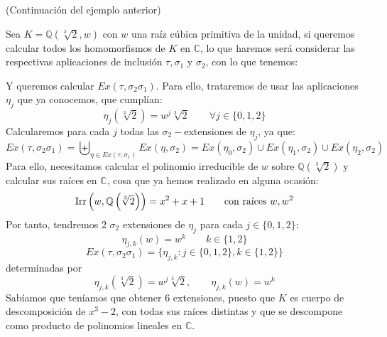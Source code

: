 \begin{ejemplo}
    (Continuación del ejemplo anterior)

    \noindent
    Sea $K = \mathbb{Q}\left(\sqrt[3]{2},w\right)$ con $w$ una raíz cúbica primitiva de la unidad, si queremos calcular todos los homomorfismos de $K$ en $\mathbb{C}$, lo que haremos será considerar las respectivas aplicaciones de inclusión $\tau,\sigma_1$ y $\sigma_2$, con lo que tenemos:
    \begin{figure}[H]
        \centering
    \end{figure}
    \noindent
    Y queremos calcular $Ex(\tau,\sigma_2\sigma_1)$. Para ello, trataremos de usar las aplicaciones $\eta_j$ que ya conocemos, que cumplían:
    \begin{equation*}
        \eta_j\left(\sqrt[3]{2}\right) = w^j \sqrt[3]{2} \qquad \forall j \in \{0,1,2\}
    \end{equation*}
    Calcularemos para cada $j$ todas las $\sigma_2-$extensiones de $\eta_j$, ya que:
    \begin{equation*}
        Ex(\tau,\sigma_2\sigma_1) = \biguplus_{\eta \in  Ex(\tau,\sigma_1)}Ex(\eta, \sigma_2) = Ex(\eta_0,\sigma_2) \cup Ex(\eta_1, \sigma_2) \cup Ex(\eta_2,\sigma_2)
    \end{equation*}
    Para ello, necesitamos calcular el polinomio irreducible de $w$ sobre $\mathbb{Q}\left(\sqrt[3]{2}\right)$ y calcular sus raíces en $\mathbb{C}$, cosa que ya hemos realizado en alguna ocasión:
    \begin{equation*}
        \operatorname{Irr}\left(w,\mathbb{Q}\left(\sqrt[3]{2}\right)\right) = x^2+x+1 \qquad \text{con raíces\ } w, w^2
    \end{equation*}
    Por tanto, tendremos 2 $\sigma_2$ extensiones de $\eta_j$ para cada $j \in \{0,1,2\}$:
    \begin{equation*}
        \eta_{j,k}(w) = w^k \qquad k \in \{1,2\}
    \end{equation*}
    \begin{equation*}
        Ex(\tau,\sigma_2\sigma_1) = \{\eta_{j,k} : j\in \{0,1,2\}, k\in \{1,2\}\}
    \end{equation*}
    determinadas por
    \begin{equation*}
        \eta_{j,k}\left(\sqrt[3]{2}\right) = w^j\sqrt[3]{2}, \qquad \eta_{j,k}(w)= w^k
    \end{equation*}
    Sabíamos que teníamos que obtener 6 extensiones, puesto que $K$ es cuerpo de descomposición de $x^3-2$, con todas sus raíces distintas y que se descompone como producto de polinomios lineales en $\mathbb{C}$.
\end{ejemplo}

